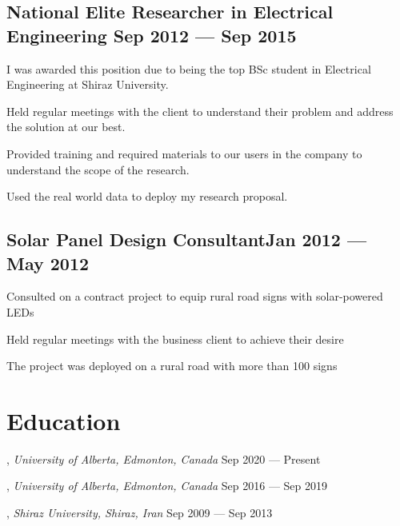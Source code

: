 \documentclass[letter,11pt]{article}
\begin{document}
\subsection{National Elite Researcher in Electrical Engineering \hfill Sep 2012 --- Sep 2015}
\begin{zitemize}
	\item I was awarded this position due to being the top BSc student in Electrical Engineering at Shiraz University.
	\item Held regular meetings with the client to understand their problem and address the solution at our best.
	\item Provided training and required materials to our users in the company to understand the scope of the research.
	\item Used the real world  data to deploy my research proposal.
\end{zitemize}


\subsection{Solar Panel Design Consultant\hfill Jan 2012 --- May 2012}
\begin{zitemize}
	\item Consulted on a contract project to equip rural road signs with solar-powered LEDs
	\item Held regular meetings with the business client to achieve their desire
	\item The project was deployed on a rural road with more than 100 signs
\end{zitemize}


\section{Education}
, \textit{University of Alberta, Edmonton, Canada}	\hfill Sep 2020 ---  Present

, \textit{University of Alberta, Edmonton, Canada}	\hfill Sep 2016 ---  Sep 2019

, \textit{Shiraz University, Shiraz, Iran} \hfill	Sep 2009 --- Sep 2013



\end{document}
